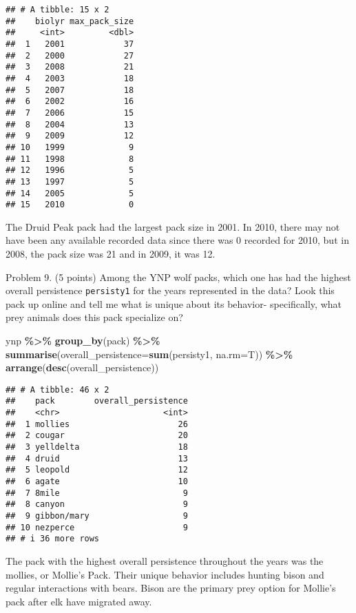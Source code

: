 \documentclass[
]{article}
\newenvironment{Shaded}{\begin{snugshade}}{\end{snugshade}}
\newcommand{\AttributeTok}[1]{\textcolor[rgb]{0.13,0.29,0.53}{#1}}
\newcommand{\FunctionTok}[1]{\textcolor[rgb]{0.13,0.29,0.53}{\textbf{#1}}}
\newcommand{\NormalTok}[1]{#1}
\newcommand{\SpecialCharTok}[1]{\textcolor[rgb]{0.81,0.36,0.00}{\textbf{#1}}}
\begin{document}
\begin{verbatim}
## # A tibble: 15 x 2
##    biolyr max_pack_size
##     <int>         <dbl>
##  1   2001            37
##  2   2000            27
##  3   2008            21
##  4   2003            18
##  5   2007            18
##  6   2002            16
##  7   2006            15
##  8   2004            13
##  9   2009            12
## 10   1999             9
## 11   1998             8
## 12   1996             5
## 13   1997             5
## 14   2005             5
## 15   2010             0
\end{verbatim}

The Druid Peak pack had the largest pack size in 2001. In 2010, there
may not have been any available recorded data since there was 0 recorded
for 2010, but in 2008, the pack size was 21 and in 2009, it was 12.

Problem 9. (5 points) Among the YNP wolf packs, which one has had the
highest overall persistence \texttt{persisty1} for the years represented
in the data? Look this pack up online and tell me what is unique about
its behavior- specifically, what prey animals does this pack specialize
on?

\begin{Shaded}
\begin{Highlighting}[]
\NormalTok{ynp }\SpecialCharTok{\%\textgreater{}\%}
  \FunctionTok{group\_by}\NormalTok{(pack) }\SpecialCharTok{\%\textgreater{}\%}
  \FunctionTok{summarise}\NormalTok{(}\AttributeTok{overall\_persistence=}\FunctionTok{sum}\NormalTok{(persisty1, }\AttributeTok{na.rm=}\NormalTok{T)) }\SpecialCharTok{\%\textgreater{}\%}
  \FunctionTok{arrange}\NormalTok{(}\FunctionTok{desc}\NormalTok{(overall\_persistence))}
\end{Highlighting}
\end{Shaded}

\begin{verbatim}
## # A tibble: 46 x 2
##    pack        overall_persistence
##    <chr>                     <int>
##  1 mollies                      26
##  2 cougar                       20
##  3 yelldelta                    18
##  4 druid                        13
##  5 leopold                      12
##  6 agate                        10
##  7 8mile                         9
##  8 canyon                        9
##  9 gibbon/mary                   9
## 10 nezperce                      9
## # i 36 more rows
\end{verbatim}

The pack with the highest overall persistence throughout the years was
the mollies, or Mollie's Pack. Their unique behavior includes hunting
bison and regular interactions with bears. Bison are the primary prey
option for Mollie's pack after elk have migrated away.
\end{document}
